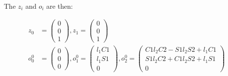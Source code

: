 The $z_i$ and $o_i$ are then:

\begin{align*}
z_0 &= 
\begin{pmatrix}
0 \\ 0 \\ 1
\end{pmatrix},
z_1 = 
\begin{pmatrix}
0 \\ 0 \\ 1
\end{pmatrix}\\
o_0^0 &= 
\begin{pmatrix}
0 \\ 0 \\ 0
\end{pmatrix},
o_1^0 = 
\begin{pmatrix}
l_1C1 \\ l_1S1 \\ 0
\end{pmatrix},
o_2^0 = 
\begin{pmatrix}
C1l_2C2-S1l_2S2+l_1C1 \\ S1l_2C2+C1l_2S2+l_1S1 \\ 0
\end{pmatrix}\\
\end{align*}

